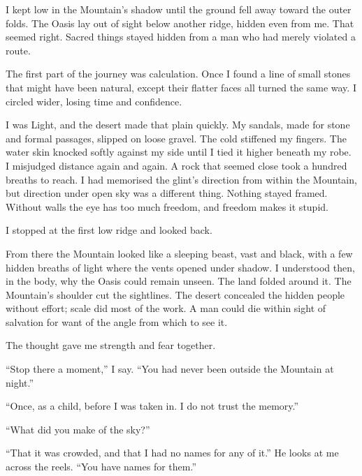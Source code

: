 I kept low in the Mountain's shadow until the ground fell away toward the outer folds. The Oasis lay out of sight below another ridge, hidden even from me. That seemed right. Sacred things stayed hidden from a man who had merely violated a route.\par

The first part of the journey was calculation. Once I found a line of small stones that might have been natural, except their flatter faces all turned the same way. I circled wider, losing time and confidence.\par

I was Light, and the desert made that plain quickly. My sandals, made for stone and formal passages, slipped on loose gravel. The cold stiffened my fingers. The water skin knocked softly against my side until I tied it higher beneath my robe. I misjudged distance again and again. A rock that seemed close took a hundred breaths to reach. I had memorised the glint's direction from within the Mountain, but direction under open sky was a different thing. Nothing stayed framed. Without walls the eye has too much freedom, and freedom makes it stupid.\par

I stopped at the first low ridge and looked back.\par

From there the Mountain looked like a sleeping beast, vast and black, with a few hidden breaths of light where the vents opened under shadow. I understood then, in the body, why the Oasis could remain unseen. The land folded around it. The Mountain's shoulder cut the sightlines. The desert concealed the hidden people without effort; scale did most of the work. A man could die within sight of salvation for want of the angle from which to see it.\par

The thought gave me strength and fear together.\par

\ornament

``Stop there a moment,'' I say. ``You had never been outside the Mountain at night.''\par

``Once, as a child, before I was taken in. I do not trust the memory.''\par

``What did you make of the sky?''\par

``That it was crowded, and that I had no names for any of it.'' He looks at me across the reels. ``You have names for them.''\par


